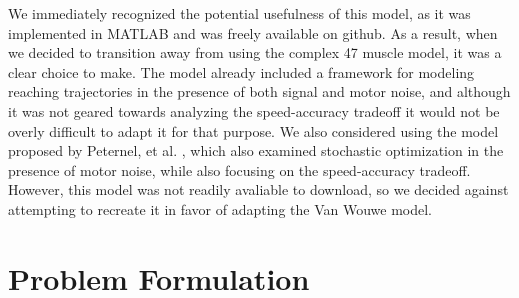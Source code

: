 \documentclass[letterpaper, 10pt, conference]{ieeeconf}
\begin{document}
We immediately recognized the potential usefulness of this model, as it was implemented in MATLAB and was freely available on github. As a result, when we decided to transition away from using the complex 47 muscle model, it was a clear choice to make. The model already included a framework for modeling reaching trajectories in the presence of both signal and motor noise, and although it was not geared towards analyzing the speed-accuracy tradeoff it would not be overly difficult to adapt it for that purpose. We also considered using the model proposed by Peternel, et al. \cite{cost_benefit_tradeoff}, which also examined stochastic optimization in the presence of motor noise, while also focusing on the speed-accuracy tradeoff. However, this model was not readily avaliable to download, so we decided against attempting to recreate it in favor of adapting the Van Wouwe model.

\section{Problem Formulation}
\end{document}
